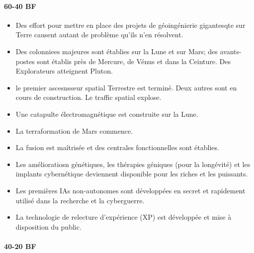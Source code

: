 \paragraph{60-40 BF} 

\begin{itemize} \item Des effort pour mettre en place des projets de géoingénierie gigantesqte sur Terre causent autant de problème qu'ils n'en résolvent. \item Des colonniees majeures sont établies sur la Lune et sur Mars; des avants-postes sont établis près de Mercure, de Vénus et dans la Ceinture. Des Explorateurs atteignent Pluton. \item le premier ascesnsseur spatial Terrestre est terminé. Deux autres sont en cours de construction. Le traffic spatial explose. \item Une catapulte électromagnétique est construite sur la Lune. \item La terraformation de Mars commence. \item La fusion est maîtrisée et des centrales fonctionnelles sont établies. \item Les amélioratiosn génétiques, les thérapies géniques (pour la longévité) et les implants cybernétique deviennent disponible pour les riches et les puissants. \item Les premières IAs non-autonomes sont développées en secret et rapidement utilisé dans la recherche et la cyberguerre. \item La technologie de relecture d'expérience (XP) est développée et mise à disposition du public. \end{itemize} 

\paragraph{40-20 BF} 

